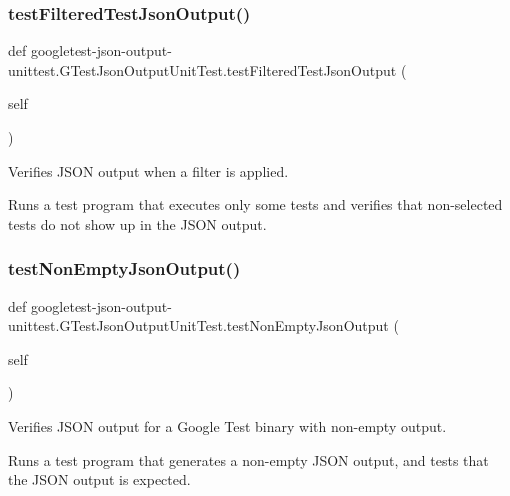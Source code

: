 \subsubsection{\texorpdfstring{testFilteredTestJsonOutput()}{testFilteredTestJsonOutput()}}
{\footnotesize\ttfamily def googletest-\/json-\/output-\/unittest.\+G\+Test\+Json\+Output\+Unit\+Test.\+test\+Filtered\+Test\+Json\+Output (\begin{DoxyParamCaption}\item[{}]{self }\end{DoxyParamCaption})}

\begin{DoxyVerb}Verifies JSON output when a filter is applied.

Runs a test program that executes only some tests and verifies that
non-selected tests do not show up in the JSON output.
\end{DoxyVerb}
 \mbox{\label{classgoogletest-json-output-unittest_1_1_g_test_json_output_unit_test_ab5520f22133356e62a54cdb5756504bc}} 
\subsubsection{\texorpdfstring{testNonEmptyJsonOutput()}{testNonEmptyJsonOutput()}}
{\footnotesize\ttfamily def googletest-\/json-\/output-\/unittest.\+G\+Test\+Json\+Output\+Unit\+Test.\+test\+Non\+Empty\+Json\+Output (\begin{DoxyParamCaption}\item[{}]{self }\end{DoxyParamCaption})}

\begin{DoxyVerb}Verifies JSON output for a Google Test binary with non-empty output.

Runs a test program that generates a non-empty JSON output, and
tests that the JSON output is expected.
\end{DoxyVerb}
 \mbox{\label{classgoogletest-json-output-unittest_1_1_g_test_json_output_unit_test_aeae00520b90ff69e832cf6a676219cf8}} 

